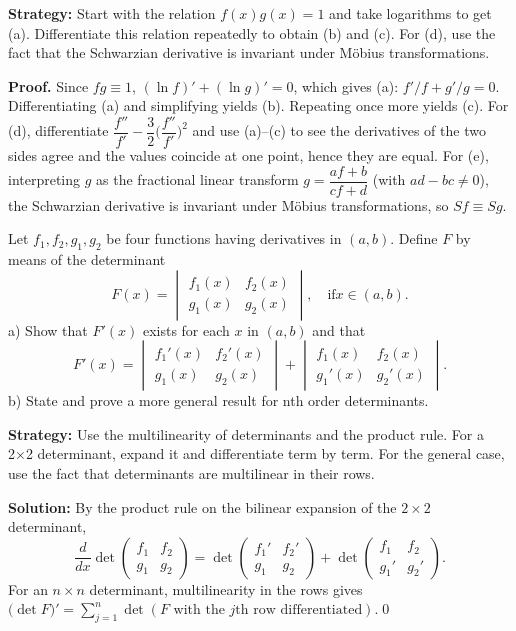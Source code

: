 \noindent\textbf{Strategy:} Start with the relation \( f(x)g(x) = 1 \) and take logarithms to get (a). Differentiate this relation repeatedly to obtain (b) and (c). For (d), use the fact that the Schwarzian derivative is invariant under Möbius transformations.

\noindent\textbf{Proof.}
Since $fg\equiv 1$, $(\ln f)'+(\ln g)'=0$, which gives (a): $f'/f+g'/g=0$. Differentiating (a) and simplifying yields (b). Repeating once more yields (c). For (d), differentiate $\dfrac{f''}{f'}-\dfrac{3}{2}\Big(\dfrac{f''}{f'}\Big)^{\!2}$ and use (a)–(c) to see the derivatives of the two sides agree and the values coincide at one point, hence they are equal. For (e), interpreting $g$ as the fractional linear transform $g=\dfrac{af+b}{cf+d}$ (with $ad-bc\ne 0$), the Schwarzian derivative is invariant under Möbius transformations, so $Sf\equiv Sg$.



\begin{problembox}
\begin{problemstatement}
Let \( f_1, f_2, g_1, g_2 \) be four functions having derivatives in \( (a, b) \). Define \( F \) by means of the determinant
\[ F(x) = \begin{vmatrix}
f_1(x) & f_2(x) \\
g_1(x) & g_2(x)
\end{vmatrix}, \quad \text{if} x \in (a, b). \]
a) Show that \( F'(x) \) exists for each \( x \) in \( (a, b) \) and that
\[ F'(x) = \begin{vmatrix}
f_1'(x) & f_2'(x) \\
g_1(x) & g_2(x)
\end{vmatrix} + \begin{vmatrix}
f_1(x) & f_2(x) \\
g_1'(x) & g_2'(x)
\end{vmatrix}. \]
b) State and prove a more general result for nth order determinants.
\end{problemstatement}
\end{problembox}

\noindent\textbf{Strategy:} Use the multilinearity of determinants and the product rule. For a 2×2 determinant, expand it and differentiate term by term. For the general case, use the fact that determinants are multilinear in their rows.

\bigskip\noindent\textbf{Solution:}
By the product rule on the bilinear expansion of the $2\times2$ determinant,
\[\frac{d}{dx}\det\begin{pmatrix}f_1&f_2\\ g_1&g_2\end{pmatrix}=\det\begin{pmatrix}f_1'&f_2'\\ g_1&g_2\end{pmatrix}+\det\begin{pmatrix}f_1&f_2\\ g_1'&g_2'\end{pmatrix}.\]
For an $n\times n$ determinant, multilinearity in the rows gives $\big(\det F\big)'=\sum_{j=1}^{n}\det(F\text{ with the $j$th row differentiated}).$\qed


